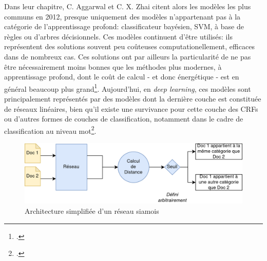 Dans leur chapitre, C. Aggarwal et C. X. Zhai citent alors les modèles les plus communs en 2012, presque uniquement des modèles n'appartenant pas à la catégorie de l'apprentissage profond: classificateur bayésien, SVM, à base de règles ou d'arbres décisionnels. Ces modèles continuent d'être utilisés: ils représentent des solutions souvent peu coûteuses computationellement, efficaces dans de nombreux cas. Ces solutions ont par ailleurs la particularité de ne pas être nécessairement moins bonnes que les méthodes plus modernes, à apprentissage profond, dont le coût de calcul - et donc énergétique - est en général beaucoup plus grand\footcite{fell_comparing_2019}. Aujourd'hui, en \textit{deep learning}, ces modèles sont principalement représentés par des modèles dont la dernière couche est constituée de réseaux linéaires, bien qu'il existe une survivance pour cette couche des CRFs ou d'autres formes de couches de classification, notamment dans le cadre de classification au niveau mot\footcite{alkhwiter_part--speech_2021, shang_speaker-change_2020}.


\begin{figure}
    \centering
    \includegraphics[width=\linewidth]{figures/chap4/Siamois.png}
    \caption{Architecture simplifiée d'un réseau siamois}
    \label{fig:chap4:structures:siamese-network}
\end{figure}

